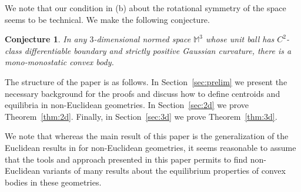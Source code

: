 \documentclass[twoside]{amsart}
\theoremstyle{plain}
\newtheorem{theorem}{Theorem}[section]
\newtheorem{conjecture}{Conjecture}
\theoremstyle{definition}
\numberwithin{equation}{section}
\newcommand{\MM}{\mathbb{M}}
\newcommand{\V}{\mathbb{V}}
\begin{document}
We note that our condition in (b) about the rotational symmetry of the space seems to be technical. We make the following conjecture.

\begin{conjecture}\label{conj:normedGomboc}
In any $3$-dimensional normed space $\MM^3$ whose unit ball has $C^2$-class differentiable boundary and strictly positive Gaussian curvature, there is a mono-monostatic convex body.
\end{conjecture}




The structure of the paper is as follows. In Section~\ref{sec:prelim} we present the necessary background for the proofs and discuss how to define centroids and equilibria in non-Euclidean geometries. In Section~\ref{sec:2d} we prove Theorem~\ref{thm:2d}. Finally, in Section~\ref{sec:3d} we prove Theorem~\ref{thm:3d}.

We note that whereas the main result of this paper is the generalization of the Euclidean results in \cite{DPR, VD} for non-Euclidean geometries, it seems reasonable to assume that the tools and approach presented in this paper permits to find non-Euclidean variants of many results about the equilibrium properties of convex bodies in these geometries.
\end{document}
